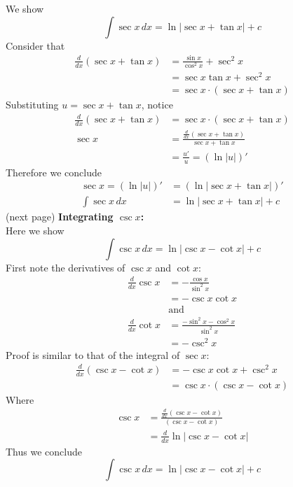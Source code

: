 \documentclass{report}
\begin{document}
We show
\begin{equation*}
\int\sec x\,dx=\ln|\sec x+\tan x|+c
\end{equation*}
Consider that
\begin{align*}
\frac{d}{dx}(\sec x+\tan x)&=\frac{\sin x}{\cos^2x}+\sec^2x\\
&=\sec x\tan x+\sec^2x\\
&=\sec x\cdot(\sec x+\tan x)
\end{align*}
Substituting $u=\sec x+\tan x$, notice
\begin{align*}
\frac{d}{dx}(\sec x+\tan x)&=\sec x\cdot(\sec x+\tan x)\\
\sec x&=\frac{\frac{d}{dx}(\sec x+\tan x)}{\sec x+\tan x}\\
&=\frac{u'}{u}=(\ln|u|)'
\end{align*}
Therefore we conclude
\begin{align*}
\sec x=(\ln|u|)'&=(\ln|\sec x+\tan x|)'\\
\int\sec x\,dx&=\ln|\sec x+\tan x|+c
\end{align*}
(next page)
\newpage
\noindent\textbf{Integrating $\csc x$:}\\
Here we show
\begin{equation*}
\int\csc x\,dx=\ln|\csc x-\cot x|+c
\end{equation*}
First note the derivatives of $\csc x$ and $\cot x$:
\begin{align*}
\frac{d}{dx}\csc x&=-\frac{\cos x}{\sin^2x}\\
&=-\csc x\cot x\\
&\text{and}\\
\frac{d}{dx}\cot x&=\frac{-\sin^2x-\cos^2x}{\sin^2x}\\
&=-\csc^2x
\end{align*}
Proof is similar to that of the integral of $\sec x$:
\begin{align*}
\frac{d}{dx}(\csc x-\cot x)&=-\csc x\cot x+\csc^2x\\
&=\csc x\cdot(\csc x-\cot x)
\end{align*}
Where
\begin{align*}
\csc x&=\frac{\frac{d}{dx}(\csc x-\cot x)}{(\csc x-\cot x)}\\
&=\frac{d}{dx}\ln|\csc x-\cot x|
\end{align*}
Thus we conclude
\begin{equation*}
\int\csc x\,dx=\ln|\csc x-\cot x|+c
\end{equation*}
\newpage
\end{document}

